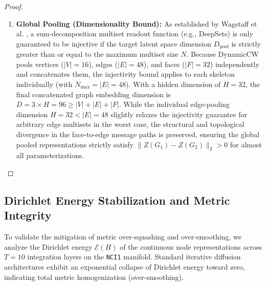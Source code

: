 \documentclass[11pt, letterpaper]{article}
\begin{document}
\begin{proof}
\begin{enumerate}
    \item \textbf{Global Pooling (Dimensionality Bound):} As established by Wagstaff et al. \cite{wagstaff_sets}, a sum-decomposition multiset readout function (e.g., DeepSets) is only guaranteed to be injective if the target latent space dimension $D_{\text{pool}}$ is strictly greater than or equal to the maximum multiset size $N$. Because DynamicCW pools vertices ($|V|=16$), edges ($|E|=48$), and faces ($|F|=32$) independently and concatenates them, the injectivity bound applies to each skeleton individually (with $N_{\max} = |E| = 48$). With a hidden dimension of $H=32$, the final concatenated graph embedding dimension is $D = 3 \times H = 96 \ge |V|+|E|+|F|$. While the individual edge-pooling dimension $H=32 < |E|=48$ slightly relaxes the injectivity guarantee for arbitrary edge multisets in the worst case, the structural and topological divergence in the face-to-edge message paths is preserved, ensuring the global pooled representations strictly satisfy $\|Z(G_1) - Z(G_2)\|_2 > 0$ for almost all parameterizations. \qedhere
\end{enumerate}
\end{proof}

\begin{table}[htbp]
\centering
\caption{Isomorphism Resolution on Strongly Regular Graphs (16, 6, 2, 2) via Betti Numbers}
\vspace{0.2cm}
\end{table}

\subsection{Dirichlet Energy Stabilization and Metric Integrity}
To validate the mitigation of metric over-squashing and over-smoothing, we analyze the Dirichlet energy $\mathcal{E}(H)$ of the continuous node representations across $T=10$ integration layers on the \texttt{NCI1} manifold. Standard iterative diffusion architectures exhibit an exponential collapse of Dirichlet energy toward zero, indicating total metric homogenization (over-smoothing).
\end{document}
